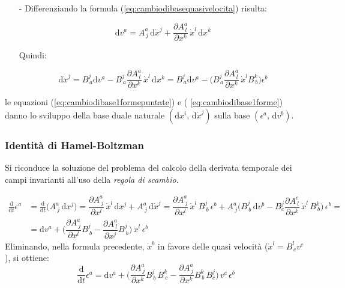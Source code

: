 \documentclass[11pt]{report}
\theoremstyle{plain}
\theoremstyle{definition}
\theoremstyle{remark}
\begin{document}
\begin{itemize}
\item[-]
Differenziando la formula (\ref{eq:cambiodibasequasivelocita}) risulta:

\begin{displaymath}
\textrm{d} v^{a} = A^{a}_{\,j} \, \textrm{d} \dot{x}^{j} + \dfrac{\partial A^{a}_{\,l}}{\partial x^{k}}\, \dot{x}^{l} \, \textrm{d} x^{k}
\end{displaymath}

Quindi:

\begin{equation}\label{eq:cambiodibase1formepuntate}
\textrm{d}\dot{x}^{j} = B^{j}_{\,a} \textrm{d} v^{a} - B^{j}_{\,a}\dfrac{\partial A^{a}_{\,l}}{\partial x^{k}}\, \dot{x}^{l} \, \textrm{d} x^{k} = B^{j}_{\,a} \textrm{d} v^{a} - \Bigr(B^{j}_{\,a}  \dfrac{\partial A^{a}_{\,l}}{\partial x^{k}}\, \dot{x}^{l} B^{k}_{\, b} \Bigr) \epsilon^{b} 
\end{equation}

\end{itemize}
le equazioni (\ref{eq:cambiodibase1formepuntate}) e ( \ref{eq:cambiodibase1forme}) danno lo sviluppo della base duale naturale $(\textrm{d}x^{i}, \, \textrm{d}\dot{x}^{j}) $ sulla base $(\epsilon^{a} , \, \textrm{d}v^{b}) $.




\subsubsection{Identità di Hamel-Boltzman}
Si riconduce la soluzione del problema del calcolo della derivata temporale dei campi invarianti all'uso della \emph{regola di scambio}.

\begin{displaymath}\begin{split}
\frac{\textrm{d}}{\textrm{d}t} \epsilon^{a} & = \frac{\textrm{d}}{\textrm{d}t}\Bigr( A^{a}_{\: j}\, \textrm{d}x^{j} \Bigr) = \dfrac{\partial A^{a}_{\: j}}{\partial x^{l}}\, \dot{x}^{l}\, \textrm{d}x^{j} + A^{a}_{\: j}\, \textrm{d}\dot{x}^{j} =
\dfrac{\partial A^{a}_{\: j}}{\partial x^{l}}\, \dot{x}^{l}\, B^{j}_{\: b}\, \epsilon^{b} + A^{a}_{\: j} \Bigr( B^{j}_{\: b} \, \textrm{d}v^{b} - B^{j}_{c} \dfrac{\partial A^{c}_{\: l}}{\partial x^{k}}\, \dot{x}^{l} \, B^{k}_{\: b}\Bigr)\, \epsilon^{b} = \\ & =
\textrm{d} v^{a} + \Bigr( \dfrac{\partial A^{a}_{\:j}}{\partial x^{l}}B^{j}_{\: b} -   \dfrac{\partial A^{a}_{\: l}}{\partial x^{j}}B^{j}_{\: b}\Bigr)\, \dot{x}^{l} \, \epsilon^{b}
\end{split}\end{displaymath}
Eliminando, nella formula precedente, $\dot{x}^{b}$ in favore delle quasi velocità ($\dot{x}^{l} = B^{l}_{\,c} v^{c}$), si ottiene:
\begin{displaymath}
\dfrac{\textrm{d}}{\textrm{d}t} \epsilon^{a} = \textrm{d}v^{a} + \Bigr( \dfrac{ \partial A^{a}_{\,j}}{\partial x^{k}} B^{j}_{\,b}\,B^{k}_{\:c} -
\dfrac{\partial A^{a}_{\,j}}{\partial x^{k}} B^{k}_{\,b}\,B^{j}_{c} \Bigr)\, v^{c} \, \epsilon^{b}
\end{displaymath}
\end{document}
